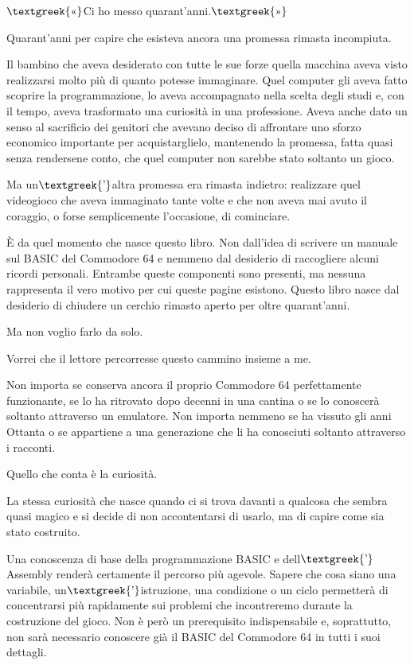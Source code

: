 \documentclass{article}
\begin{document}
$\text{\textgreek{«}}$Ci ho messo quarant'anni.$\text{\textgreek{»}}$

Quarant'anni per capire che esisteva ancora una promessa rimasta incompiuta.

Il bambino che aveva desiderato con tutte le sue forze quella macchina aveva visto realizzarsi molto più di quanto
potesse immaginare. Quel computer gli aveva fatto scoprire la programmazione, lo aveva accompagnato nella scelta degli
studi e, con il tempo, aveva trasformato una curiosità in una professione. Aveva anche dato un senso al sacrificio dei
genitori che avevano deciso di affrontare uno sforzo economico importante per acquistarglielo, mantenendo la promessa,
fatta quasi senza rendersene conto, che quel computer non sarebbe stato soltanto un gioco.

Ma un$\text{\textgreek{’}}$altra promessa era rimasta indietro: realizzare quel videogioco che aveva immaginato tante
volte e che non aveva mai avuto il coraggio, o forse semplicemente l'occasione, di cominciare.

È da quel momento che nasce questo libro. Non dall'idea di scrivere un manuale sul BASIC del Commodore 64 e nemmeno dal
desiderio di raccogliere alcuni ricordi personali. Entrambe queste componenti sono presenti, ma nessuna rappresenta il
vero motivo per cui queste pagine esistono. Questo libro nasce dal desiderio di chiudere un cerchio rimasto aperto per
oltre quarant'anni.

Ma non voglio farlo da solo.

Vorrei che il lettore percorresse questo cammino insieme a me.

Non importa se conserva ancora il proprio Commodore 64 perfettamente funzionante, se lo ha ritrovato dopo decenni in una
cantina o se lo conoscerà soltanto attraverso un emulatore. Non importa nemmeno se ha vissuto gli anni Ottanta o se
appartiene a una generazione che li ha conosciuti soltanto attraverso i racconti.

Quello che conta è la curiosità.

La stessa curiosità che nasce quando ci si trova davanti a qualcosa che sembra quasi magico e si decide di non
accontentarsi di usarlo, ma di capire come sia stato costruito.

Una conoscenza di base della programmazione BASIC e dell$\text{\textgreek{’}}$Assembly renderà certamente il percorso
più agevole. Sapere che cosa siano una variabile, un$\text{\textgreek{’}}$istruzione, una condizione o un ciclo
permetterà di concentrarsi più rapidamente sui problemi che incontreremo durante la costruzione del gioco. Non è però
un prerequisito indispensabile e, soprattutto, non sarà necessario conoscere già il BASIC del Commodore 64 in tutti i
suoi dettagli.
\end{document}
